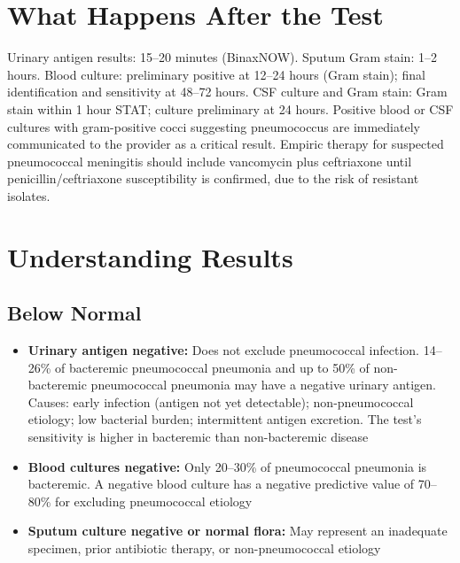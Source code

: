 \section*{What Happens After the Test}
Urinary antigen results: 15--20 minutes (BinaxNOW). Sputum Gram stain: 1--2 hours. Blood culture: preliminary positive at 12--24 hours (Gram stain); final identification and sensitivity at 48--72 hours. CSF culture and Gram stain: Gram stain within 1 hour STAT; culture preliminary at 24 hours. Positive blood or CSF cultures with gram-positive cocci suggesting pneumococcus are immediately communicated to the provider as a critical result. Empiric therapy for suspected pneumococcal meningitis should include vancomycin plus ceftriaxone until penicillin/ceftriaxone susceptibility is confirmed, due to the risk of resistant isolates.

\section*{Understanding Results}

\subsection*{Below Normal}
\begin{itemize}
  \item \textbf{Urinary antigen negative:} Does not exclude pneumococcal infection. 14--26\% of bacteremic pneumococcal pneumonia and up to 50\% of non-bacteremic pneumococcal pneumonia may have a negative urinary antigen. Causes: early infection (antigen not yet detectable); non-pneumococcal etiology; low bacterial burden; intermittent antigen excretion. The test's sensitivity is higher in bacteremic than non-bacteremic disease
  \item \textbf{Blood cultures negative:} Only 20--30\% of pneumococcal pneumonia is bacteremic. A negative blood culture has a negative predictive value of 70--80\% for excluding pneumococcal etiology
  \item \textbf{Sputum culture negative or normal flora:} May represent an inadequate specimen, prior antibiotic therapy, or non-pneumococcal etiology
\end{itemize}

